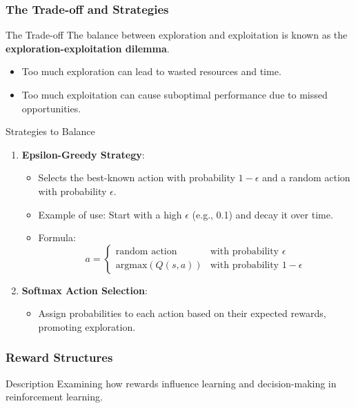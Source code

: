 \documentclass[aspectratio=169]{beamer}
\begin{document}
\begin{frame}[fragile]
    \frametitle{The Trade-off and Strategies}
    \begin{block}{The Trade-off}
        The balance between exploration and exploitation is known as the \textbf{exploration-exploitation dilemma}.
        
        \begin{itemize}
            \item Too much exploration can lead to wasted resources and time.
            \item Too much exploitation can cause suboptimal performance due to missed opportunities.
        \end{itemize}
    \end{block}

    \begin{block}{Strategies to Balance}
        \begin{enumerate}
            \item \textbf{Epsilon-Greedy Strategy}:
            \begin{itemize}
                \item Selects the best-known action with probability $1 - \epsilon$ and a random action with probability $\epsilon$.
                \item Example of use: Start with a high $\epsilon$ (e.g., 0.1) and decay it over time.
                \item Formula:
                \[
                a = 
                \begin{cases} 
                \text{random action} & \text{with probability } \epsilon \\ 
                \text{argmax}(Q(s, a)) & \text{with probability } 1 - \epsilon
                \end{cases}
                \]
            \end{itemize}
            \item \textbf{Softmax Action Selection}:
            \begin{itemize}
                \item Assign probabilities to each action based on their expected rewards, promoting exploration.
            \end{itemize}
        \end{enumerate}
    \end{block}
\end{frame}

\begin{frame}[fragile]
    \frametitle{Reward Structures}

    \begin{block}{Description}
        Examining how rewards influence learning and decision-making in reinforcement learning.
    \end{block}
\end{frame}
\end{document}
